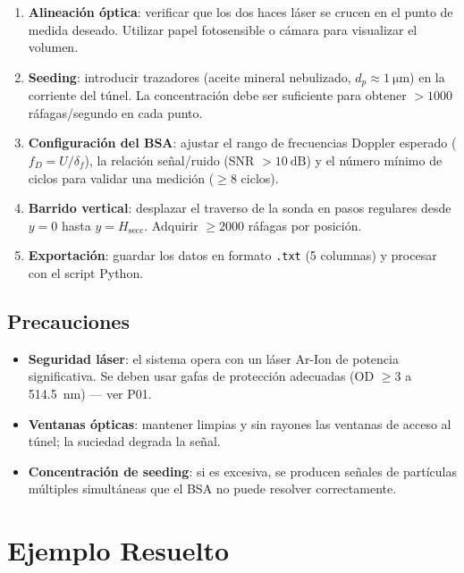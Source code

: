 \documentclass[12pt,a4paper]{article}
\begin{document}
\begin{enumerate}
	\item \textbf{Alineación óptica}: verificar que los dos haces láser se
	      crucen en el punto de medida deseado.  Utilizar papel fotosensible
	      o cámara para visualizar el volumen.
	\item \textbf{Seeding}: introducir trazadores (aceite mineral nebulizado,
	      $d_p \approx \SI{1}{\micro\m}$) en la corriente del túnel.  La
	      concentración debe ser suficiente para obtener $> 1000$
	      ráfagas/segundo en cada punto.
	\item \textbf{Configuración del BSA}: ajustar el rango de frecuencias
	      Doppler esperado ($f_D = U/\delta_f$), la relación señal/ruido
	      (SNR $> \SI{10}{\dB}$) y el número mínimo de ciclos para validar
	      una medición ($\geq 8$ ciclos).
	\item \textbf{Barrido vertical}: desplazar el traverso de la sonda en
	      pasos regulares desde $y = 0$ hasta $y = H_\mathrm{secc}$.
	      Adquirir $\geq 2000$ ráfagas por posición.
	\item \textbf{Exportación}: guardar los datos en formato \texttt{.txt}
	      (5 columnas) y procesar con el script Python.
\end{enumerate}

\subsection{Precauciones}

\begin{itemize}
	\item \textbf{Seguridad láser}: el sistema opera con un láser Ar-Ion de
	      potencia significativa.  Se deben usar gafas de protección
	      adecuadas (OD $\geq 3$ a \SI{514,5}{\nm}) --- ver P01.
	\item \textbf{Ventanas ópticas}: mantener limpias y sin rayones las
	      ventanas de acceso al túnel; la suciedad degrada la señal.
	\item \textbf{Concentración de seeding}: si es excesiva, se producen
	      señales de partículas múltiples simultáneas que el BSA no puede
	      resolver correctamente.
\end{itemize}

\section{Ejemplo Resuelto}
\label{sec:ejemplo}
\end{document}
